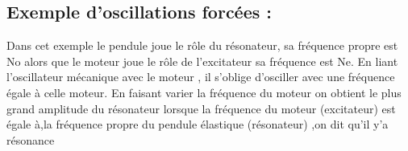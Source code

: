 \documentclass[12pt]{article}
\begin{document}
\subsection{Exemple d'oscillations forcées : }




Dans cet exemple le pendule joue le rôle du résonateur, sa fréquence propre est No alors que le moteur joue le rôle de
l’excitateur sa fréquence est Ne.
En liant l’oscillateur mécanique avec le moteur , il s'oblige d'osciller avec une fréquence égale à celle moteur.
En faisant varier la fréquence du moteur on obtient le plus grand amplitude du résonateur lorsque la fréquence du moteur (excitateur) est égale à,la fréquence propre du pendule élastique (résonateur) ,on dit qu’il y’a résonance




\end{document}
